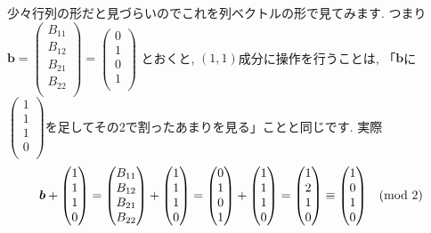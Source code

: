 \documentclass[dvipdfmx,a4paper,11pt]{article}
\theoremstyle{definition}
\begin{document}
少々行列の形だと見づらいのでこれを列ベクトルの形で見てみます.
つまり
$
 \bm{b} 
 =
  \begin{pmatrix}
B_{11} \\
B_{12} \\
B_{21} \\
B_{22} \\
 \end{pmatrix} 
 =
   \begin{pmatrix}
0 \\
1\\
0\\
1\\
 \end{pmatrix} 
 $
 とおくと, $(1,1)$成分に操作を行うことは, 「$\bm{b}$に
 $
 \begin{pmatrix}
1 \\
1\\
1\\
0\\
 \end{pmatrix}
 $を足してその2で割ったあまりを見る」ことと同じです. 実際
 $$ \bm{b} 
 +
 \begin{pmatrix}
1 \\
1\\
1\\
0\\
 \end{pmatrix} 
 = 
   \begin{pmatrix}
B_{11} \\
B_{12} \\
B_{21} \\
B_{22} \\
 \end{pmatrix} 
 + 
  \begin{pmatrix}
1 \\
1\\
1\\
0\\
 \end{pmatrix} 
 =
    \begin{pmatrix}
0 \\
1\\
0\\
1\\
 \end{pmatrix} 
 + 
  \begin{pmatrix}
1 \\
1\\
1\\
0\\
 \end{pmatrix} 
 =
   \begin{pmatrix}
1 \\
2\\
1\\
0\\
 \end{pmatrix} 
 \equiv
  \begin{pmatrix}
1 \\
0\\
1\\
0\\
 \end{pmatrix} 
  \text{\,\,\, (mod 2)}
 $$
\end{document}
